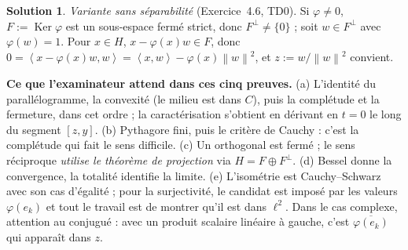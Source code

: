 \documentclass[11pt,a4paper]{article}
\newcommand{\norm}[1]{\left\|#1\right\|}
\newcommand{\ps}[2]{\left\langle #1,#2\right\rangle}
\DeclareMathOperator{\Ker}{Ker}
\theoremstyle{definition}
\newtheorem*{solution}{Solution}
\begin{document}
\begin{solution}
\emph{Variante sans séparabilité} (Exercice~4.6, TD0). Si $\varphi\ne0$, $F:=\Ker\varphi$ est un sous-espace fermé strict, donc $F^\perp\ne\{0\}$ ; soit $w\in F^\perp$ avec $\varphi(w)=1$. Pour $x\in H$, $x-\varphi(x)w\in F$, donc $0=\ps{x-\varphi(x)w}w=\ps xw-\varphi(x)\norm w^2$, et $z:=w/\norm w^2$ convient.
\end{solution}

\begin{methode}
\textbf{Ce que l'examinateur attend dans ces cinq preuves.} (a) L'identité du parallélogramme, la convexité (le milieu est dans $C$), puis la complétude et la fermeture, dans cet ordre ; la caractérisation s'obtient en dérivant en $t=0$ le long du segment $[z,y]$. (b) Pythagore fini, puis le critère de Cauchy : c'est la complétude qui fait le sens difficile. (c) Un orthogonal est fermé ; le sens réciproque \emph{utilise le théorème de projection} via $H=F\oplus F^\perp$. (d) Bessel donne la convergence, la totalité identifie la limite. (e) L'isométrie est Cauchy--Schwarz avec son cas d'égalité ; pour la surjectivité, le candidat est imposé par les valeurs $\varphi(e_k)$ et tout le travail est de montrer qu'il est dans $\ell^2$. Dans le cas complexe, attention au conjugué : avec un produit scalaire linéaire à gauche, c'est $\overline{\varphi(e_k)}$ qui apparaît dans $z$.
\end{methode}
\end{document}
